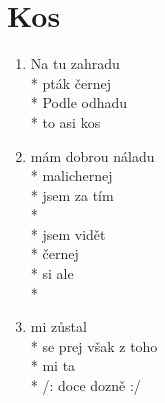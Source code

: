 \section{Kos}
\begin{enumerate}
\item Na tu  zahradu \\*
 pták černej \\*
Podle  odhadu \\*
 to asi kos 
\item {} mám dobrou náladu \\*
 malichernej \\*
 jsem za tím  \\*
     \\*
 jsem vidět  \\*
 černej  \\*
 si ale  \\*
  
\item {} mi    zůstal  \\*
 se prej   však z toho  \\*
 mi ta             \\*
/:  doce   dozně :/
\end{enumerate}
